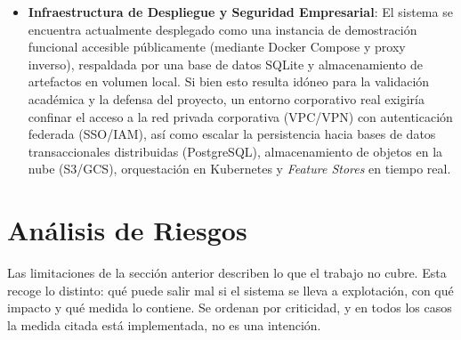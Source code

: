 \begin{itemize}
    \item \textbf{Infraestructura de Despliegue y Seguridad Empresarial}: El sistema se encuentra actualmente desplegado como una instancia de demostración funcional accesible públicamente (mediante Docker Compose y proxy inverso), respaldada por una base de datos SQLite y almacenamiento de artefactos en volumen local. Si bien esto resulta idóneo para la validación académica y la defensa del proyecto, un entorno corporativo real exigiría confinar el acceso a la red privada corporativa (VPC/VPN) con autenticación federada (SSO/IAM), así como escalar la persistencia hacia bases de datos transaccionales distribuidas (PostgreSQL), almacenamiento de objetos en la nube (S3/GCS), orquestación en Kubernetes y \textit{Feature Stores} en tiempo real.
\end{itemize}

\section{Análisis de Riesgos}
\label{sec:analisis_riesgos}

Las limitaciones de la sección anterior describen lo que el trabajo no cubre. Esta recoge lo distinto: qué puede salir mal si el sistema se lleva a explotación, con qué impacto y qué medida lo contiene. Se ordenan por criticidad, y en todos los casos la medida citada está implementada, no es una intención.

